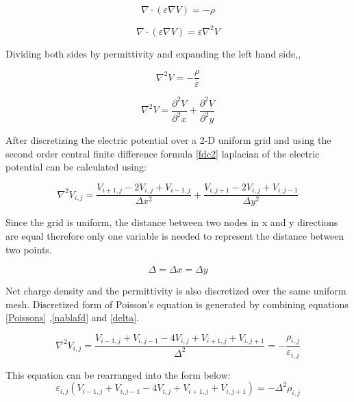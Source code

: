 \begin{doublespace}
\begin{equation}
\nabla \cdot  (\varepsilon \nabla V)=-\rho
\end{equation}

\begin{equation}
\nabla \cdot  (\varepsilon \nabla V)=\varepsilon  \nabla^2 V
\end{equation}

Dividing both sides by permittivity and expanding the left hand side,,

\begin{equation}
 \nabla^2 V =-\frac{\rho}{\varepsilon}
 \label{Poissons}
\end{equation}

\begin{equation}
 \nabla^2 V =\frac{\partial^2 V}{\partial^2 x}+\frac{\partial^2 V}{\partial^2 y}
\end{equation}

After discretizing the electric potential over a 2-D uniform grid and using the second order central finite difference formula \eqref{fdc2} laplacian of the electric potential can be calculated using:

\begin{equation}
 \nabla^2 V_{i,j}=\frac{V_{i+1,j}-2V_{i,j}+V_{i-1,j}}{\Delta x^2}+\frac{V_{i,j+1}-2V_{i,j}+V_{i,j-1}}{\Delta y^2}
 \label{nablafd}
\end{equation}

Since the grid is uniform, the distance between two nodes in x and y directions are equal therefore only one variable is needed to represent the distance between two points.

\begin{equation}
\Delta=\Delta x =\Delta y
\label{delta}
\end{equation}

Net charge density and the permittivity is also discretized over the same uniform mesh. Discretized form of Poisson's equation is generated by combining equations \ref{Poissons} ,\ref{nablafd} and \ref{delta}.

\begin{equation}
 \nabla^2 V_{i,j}=\frac{V_{i-1,j}+V_{i,j-1}-4V_{i,j}+V_{i+1,j}+V_{i,j+1}}{\Delta^2}=-\frac{\rho_{i,j}}{\varepsilon_{i,j}}
\end{equation}

This equation can be rearranged into the form below:
\begin{equation}
\varepsilon_{i,j}(V_{i-1,j}+V_{i,j-1}-4V_{i,j}+V_{i+1,j}+V_{i,j+1})=-\Delta^2\rho_{i,j}
\label{discrete_poisson}
\end{equation}


\end{doublespace}
